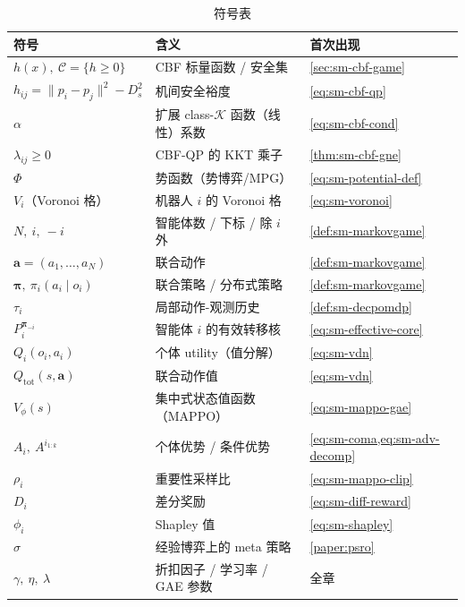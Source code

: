 \begin{table}[H]\centering\small
\caption{符号表}
\begin{tabular}{lll}
\toprule
符号 & 含义 & 首次出现 \\
\midrule
$h(x),\ \mathcal{C}=\{h\ge0\}$ & CBF 标量函数 / 安全集 & \cref{sec:sm-cbf-game} \\
$h_{ij}=\|p_i-p_j\|^2-D_s^2$ & 机间安全裕度 & \cref{eq:sm-cbf-qp} \\
$\alpha$ & 扩展 class-$\mathcal{K}$ 函数（线性）系数 & \cref{eq:sm-cbf-cond} \\
$\lambda_{ij}\ge0$ & CBF-QP 的 KKT 乘子 & \cref{thm:sm-cbf-gne} \\
$\Phi$ & 势函数（势博弈/MPG） & \cref{eq:sm-potential-def} \\
$V_i$（Voronoi 格） & 机器人 $i$ 的 Voronoi 格 & \cref{eq:sm-voronoi} \\
$N,\ i,\ -i$ & 智能体数 / 下标 / 除 $i$ 外 & \cref{def:sm-markovgame} \\
$\mathbf{a}=(a_1,\dots,a_N)$ & 联合动作 & \cref{def:sm-markovgame} \\
$\boldsymbol{\pi},\ \pi_i(a_i\mid o_i)$ & 联合策略 / 分布式策略 & \cref{def:sm-markovgame} \\
$\tau_i$ & 局部动作-观测历史 & \cref{def:sm-decpomdp} \\
$P_i^{\boldsymbol{\pi}_{-i}}$ & 智能体 $i$ 的有效转移核 & \cref{eq:sm-effective-core} \\
$Q_i(o_i,a_i)$ & 个体 utility（值分解） & \cref{eq:sm-vdn} \\
$Q_{\text{tot}}(s,\mathbf{a})$ & 联合动作值 & \cref{eq:sm-vdn} \\
$V_\phi(s)$ & 集中式状态值函数（MAPPO） & \cref{eq:sm-mappo-gae} \\
$A_i,\ A^{i_{1:k}}$ & 个体优势 / 条件优势 & \cref{eq:sm-coma,eq:sm-adv-decomp} \\
$\rho_i$ & 重要性采样比 & \cref{eq:sm-mappo-clip} \\
$D_i$ & 差分奖励 & \cref{eq:sm-diff-reward} \\
$\phi_i$ & Shapley 值 & \cref{eq:sm-shapley} \\
$\sigma$ & 经验博弈上的 meta 策略 & \cref{paper:psro} \\
$\gamma,\ \eta,\ \lambda$ & 折扣因子 / 学习率 / GAE 参数 & 全章 \\
\bottomrule
\end{tabular}
\end{table}

